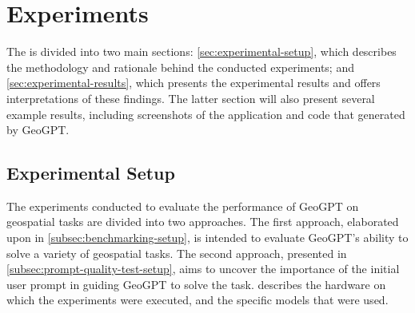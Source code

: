 \chapter{Experiments}
\label{cha:experiments}

The  is divided into two main sections: \autoref{sec:experimental-setup}, which describes the methodology and rationale behind the conducted experiments; and \autoref{sec:experimental-results}, which presents the experimental results and offers interpretations of these findings. The latter section will also present several example results, including screenshots of the application and code that generated by GeoGPT.

\section{Experimental Setup}
\label{sec:experimental-setup}

\begin{comment}
Trying and failing is a major part of research. However, to have a chance of success you need a plan driving the experimental research, just as you need a plan for your literature search. Further, plans are made to be revised and this revision ensures that any further decisions made are in line with the work already completed.

The plan should include what experiments or series of experiments are planned and what questions the individual or set of experiments aim to answer. Such questions should be connected to your research questions, so that in the evaluation of your results you can discuss the results wrt to the research questions.
\end{comment}

\begin{comment}
The experimental setup should include all data --- parameters, etc. --- that would allow a person to repeat your experiments.
This will thus be the actual instantiation for each experiment of the general architecture described in Chapter~\ref{cha:architecture}.
\end{comment}

The experiments conducted to evaluate the performance of GeoGPT on geospatial tasks are divided into two approaches. The first approach, elaborated upon in \autoref{subsec:benchmarking-setup}, is intended to evaluate GeoGPT's ability to solve a variety of geospatial tasks. The second approach, presented in \autoref{subsec:prompt-quality-test-setup}, aims to uncover the importance of the initial user prompt in guiding GeoGPT to solve the task.  describes the hardware on which the experiments were executed, and the specific models that were used.

